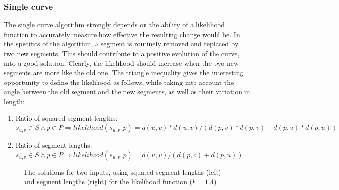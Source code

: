 \documentclass[11pt]{article}
\begin{document}
\subsubsection{Single curve}
The single curve algorithm strongly depends on the ability of a likelihood function to accurately measure how effective the resulting change would be. In the specifics of the algorithm, a segment is routinely removed and replaced by two new segments. This should contribute to a positive evolution of the curve, into a good solution. Clearly, the likelihood should increase when the two new segments are more like the old one. The triangle inequality gives the interesting opportunity to define the likelihood as follows, while taking into account the angle between the old segment and the new segments, as well as their variation in length:

\noindent
\begin{enumerate}
\topsep=0pt
\itemsep=0pt
\parsep=0pt
\item Ratio of squared segment lengths:\\
$s_{u,v} \in S \wedge p \in P \Rightarrow likelihood(s_{u,v}, p) = d(u, v)*d(u, v)/(d(p, v)*d(p, v)+d(p, u)*d(p, u))$
\item Ratio of segment lengths:\\
$s_{u,v} \in S \wedge p \in P \Rightarrow likelihood(s_{u,v}, p) = d(u, v)/(d(p, v)+d(p, u))$
\end{enumerate}

\begingroup
{}%
\begin{figure}[ht!]
\centering
\begin{subfigure}{.24\linewidth}
\centering

\label{fig:exp:single_parameter_a:first}
\end{subfigure}%
\begin{subfigure}{.24\linewidth}
\centering

\label{fig:exp:single_parameter_a:second}
\centering
\end{subfigure}
\begin{subfigure}{.24\linewidth}
\centering

\label{fig:exp:single_parameter_a:third}
\end{subfigure}%
\begin{subfigure}{.24\linewidth}
\centering

\label{fig:exp:single_parameter_a:fourth}
\centering
\end{subfigure}
\caption{The solutions for two inputs, using squared segment lengths (left) and segment lengths (right) for the likelihood function ($k = 1.4$)}
\end{figure}
\endgroup
\end{document}
